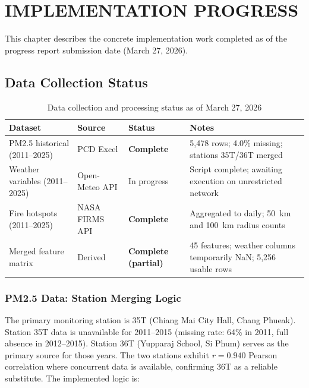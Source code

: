 \documentclass[12pt,a4paper]{report}
\begin{document}
\chapter{IMPLEMENTATION PROGRESS}

This chapter describes the concrete implementation work completed as of the progress report submission date (March 27, 2026).

\section{Data Collection Status}

\begin{table}[H]
\centering
\caption{Data collection and processing status as of March 27, 2026}
\label{tab:data_status}
\begin{tabularx}{\textwidth}{@{}p{3.5cm}p{2.2cm}p{2.2cm}X@{}}
\toprule
\textbf{Dataset} & \textbf{Source} & \textbf{Status} & \textbf{Notes} \\
\midrule
PM2.5 historical (2011--2025) & PCD Excel & {\bfseries Complete} & 5,478 rows; 4.0\% missing; stations 35T/36T merged \\[4pt]
Weather variables (2011--2025) & Open-Meteo API & In progress & Script complete; awaiting execution on unrestricted network \\[4pt]
Fire hotspots (2011--2025) & NASA FIRMS API & {\bfseries Complete} & Aggregated to daily; 50~km and 100~km radius counts \\[4pt]
Merged feature matrix & Derived & {\bfseries Complete (partial)} & 45 features; weather columns temporarily NaN; 5,256 usable rows \\
\bottomrule
\end{tabularx}
\end{table}

\subsection{PM2.5 Data: Station Merging Logic}

The primary monitoring station is 35T (Chiang Mai City Hall, Chang Phueak). Station 35T data is unavailable for 2011--2015 (missing rate: 64\% in 2011, full absence in 2012--2015). Station 36T (Yupparaj School, Si Phum) serves as the primary source for those years. The two stations exhibit $r = 0.940$ Pearson correlation where concurrent data is available, confirming 36T as a reliable substitute. The implemented logic is:
\end{document}
